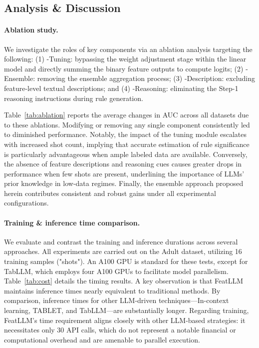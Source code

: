 \subsection{Analysis \& Discussion}
\label{sec:analysis}
\paragraph{Ablation study.} 
We investigate the roles of key components via an ablation analysis targeting the following: (1) \textsf{-Tuning}: bypassing the weight adjustment stage within the linear model and directly summing the binary feature outputs to compute logits; (2) \textsf{-Ensemble}: removing the ensemble aggregation process; (3) \textsf{-Description}: excluding feature-level textual descriptions; and (4) \textsf{-Reasoning}: eliminating the Step-1 reasoning instructions during rule generation.

Table~\ref{tab:ablation} reports the average changes in AUC across all datasets due to these ablations. Modifying or removing any single component consistently led to diminished performance. Notably, the impact of the tuning module escalates with increased shot count, implying that accurate estimation of rule significance is particularly advantageous when ample labeled data are available. Conversely, the absence of feature descriptions and reasoning cues causes greater drops in performance when few shots are present, underlining the importance of LLMs’ prior knowledge in low-data regimes. Finally, the ensemble approach proposed herein contributes consistent and robust gains under all experimental configurations.

\vspace*{-0.12in}
\paragraph{Training \& inference time comparison.} We evaluate and contrast the training and inference durations across several approaches. All experiments are carried out on the Adult dataset, utilizing 16 training samples ("shots"). An A100 GPU is standard for these tests, except for TabLLM, which employs four A100 GPUs to facilitate model parallelism. Table~\ref{tab:cost} details the timing results. A key observation is that \textsf{FeatLLM} maintains inference times nearly equivalent to traditional methods. By comparison, inference times for other LLM-driven techniques—In-context learning, TABLET, and TabLLM—are substantially longer. Regarding training, \textsf{FeatLLM}'s time requirement aligns closely with other LLM-based strategies: it necessitates only 30 API calls, which do not represent a notable financial or computational overhead and are amenable to parallel execution.

